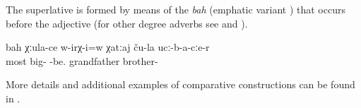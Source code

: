 The superlative is formed by means of the  \textit{bah}  (emphatic variant ) that occurs before the adjective  (for other degree adverbs see  and ).

\begin{exe}
	\ex	\label{ex:Was (our) grandfather the oldest among his brothers}
	\gll	bah	χːula-ce	w-irχ-i=w	χatːaj	ču-la	ucː-b-a-cːe-r \\
		most	big-	-be.	grandfather		brother- \\
	\glt	{}
\end{exe}

More details and additional examples of comparative constructions can be found in .




